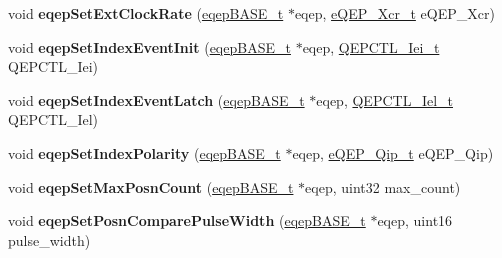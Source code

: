 \begin{DoxyCompactItemize}
\item 
\mbox{\label{group__eQEP_ga1ebc9caa0ec32b5372b57dee399fedc8}} 
void {\bfseries eqep\+Set\+Ext\+Clock\+Rate} (\mbox{\hyperlink{reg__eqep_8h_a794db63555812863c39c5d214fd4f215}{eqep\+B\+A\+S\+E\+\_\+t}} $\ast$eqep, \mbox{\hyperlink{eqep_8h_a1ad1a4f36a78f5e6f3280953d8af7d33}{e\+Q\+E\+P\+\_\+\+Xcr\+\_\+t}} e\+Q\+E\+P\+\_\+\+Xcr)
\item 
\mbox{\label{group__eQEP_gae23c654af623c5923fb71edee1677187}} 
void {\bfseries eqep\+Set\+Index\+Event\+Init} (\mbox{\hyperlink{reg__eqep_8h_a794db63555812863c39c5d214fd4f215}{eqep\+B\+A\+S\+E\+\_\+t}} $\ast$eqep, \mbox{\hyperlink{eqep_8h_a07e1895876cbc221c587de63ac943941}{Q\+E\+P\+C\+T\+L\+\_\+\+Iei\+\_\+t}} Q\+E\+P\+C\+T\+L\+\_\+\+Iei)
\item 
\mbox{\label{group__eQEP_gaee54c703cf3359a817ebdc43f3fc58d3}} 
void {\bfseries eqep\+Set\+Index\+Event\+Latch} (\mbox{\hyperlink{reg__eqep_8h_a794db63555812863c39c5d214fd4f215}{eqep\+B\+A\+S\+E\+\_\+t}} $\ast$eqep, \mbox{\hyperlink{eqep_8h_af07b37d99d0fb7f0d72c9ff773f11ed9}{Q\+E\+P\+C\+T\+L\+\_\+\+Iel\+\_\+t}} Q\+E\+P\+C\+T\+L\+\_\+\+Iel)
\item 
\mbox{\label{group__eQEP_gaacaab6a3e8ec13ea696c107b778f2611}} 
void {\bfseries eqep\+Set\+Index\+Polarity} (\mbox{\hyperlink{reg__eqep_8h_a794db63555812863c39c5d214fd4f215}{eqep\+B\+A\+S\+E\+\_\+t}} $\ast$eqep, \mbox{\hyperlink{eqep_8h_afcc2655699b97debc2be04b7a5c2a38c}{e\+Q\+E\+P\+\_\+\+Qip\+\_\+t}} e\+Q\+E\+P\+\_\+\+Qip)
\item 
\mbox{\label{group__eQEP_ga9a8204112c02224fe3053531600b0f45}} 
void {\bfseries eqep\+Set\+Max\+Posn\+Count} (\mbox{\hyperlink{reg__eqep_8h_a794db63555812863c39c5d214fd4f215}{eqep\+B\+A\+S\+E\+\_\+t}} $\ast$eqep, uint32 max\+\_\+count)
\item 
\mbox{\label{group__eQEP_gad0ad263c52640a6e29ae319985475103}} 
void {\bfseries eqep\+Set\+Posn\+Compare\+Pulse\+Width} (\mbox{\hyperlink{reg__eqep_8h_a794db63555812863c39c5d214fd4f215}{eqep\+B\+A\+S\+E\+\_\+t}} $\ast$eqep, uint16 pulse\+\_\+width)
\item 
\mbox{\label{group__eQEP_gaf71ce200aed75fdca47faedc2e5f52c7}} 

\end{DoxyCompactItemize}
